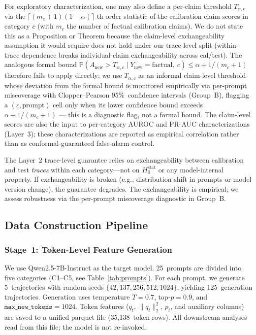 \documentclass[runningheads]{llncs}
\newcommand{\Hnull}{H_0^{\text{stat}}}
\begin{document}
\begin{remark}
\label{prop:claim-level}
For exploratory characterization, one may also define a per-claim
threshold $T_{\alpha, c}$ via the
$\lceil (m_c+1)(1-\alpha) \rceil$-th order statistic of the calibration
claim scores in category $c$ (with $m_c$ the number of factual calibration
claims). We do not state this as a Proposition or Theorem because the
claim-level exchangeability assumption it would require does not hold
under our trace-level split (within-trace dependence breaks individual-claim
exchangeability across cal/test). The analogous formal bound
$\mathbb{P}(A_{\text{new}} > T_{\alpha, c} \mid Y_{\text{new}} = \text{factual},\ c)
\le \alpha + 1/(m_c+1)$ therefore fails to apply directly; we use
$T_{\alpha,c}$ as an informal claim-level threshold whose deviation from
the formal bound is monitored empirically via per-prompt miscoverage with
Clopper--Pearson 95\%~confidence intervals (Group~B), flagging a
$(c, \text{prompt})$ cell only when its lower confidence bound exceeds
$\alpha + 1/(m_c+1)$ — this is a diagnostic flag, not a formal bound.
The claim-level scores are also the input to per-category AUROC and
PR-AUC characterizations (Layer~3); these characterizations are
reported as empirical correlation rather than as conformal-guaranteed
false-alarm control.
\end{remark}

\begin{remark}
The Layer~2 trace-level guarantee relies on exchangeability between
calibration and test \emph{traces} within each category---not on $\Hnull$
or any model-internal property. If exchangeability is broken (e.g.,
distribution shift in prompts or model version change), the guarantee
degrades. The exchangeability is empirical; we assess robustness via the
per-prompt miscoverage diagnostic in Group~B.
\end{remark}

\subsection{Data Construction Pipeline}

\subsubsection{Stage~1: Token-Level Feature Generation}

We use Qwen2.5-7B-Instruct as the target model. 25~prompts are divided into
five categories (C1--C5, see Table~\ref{tab:prompts}). For each prompt,
we generate 5~trajectories with random seeds
$\{42, 137, 256, 512, 1024\}$, yielding 125~generation trajectories.
Generation uses temperature $T = 0.7$, top-$p = 0.9$, and
$\texttt{max\_new\_tokens} = 1024$. Token features ($q_t$, $\|q_t\|_2^2$,
$p_t$, and auxiliary columns) are saved to a unified parquet file
(35,138~token rows). All downstream analyses read from this file;
the model is not re-invoked.
\end{document}
